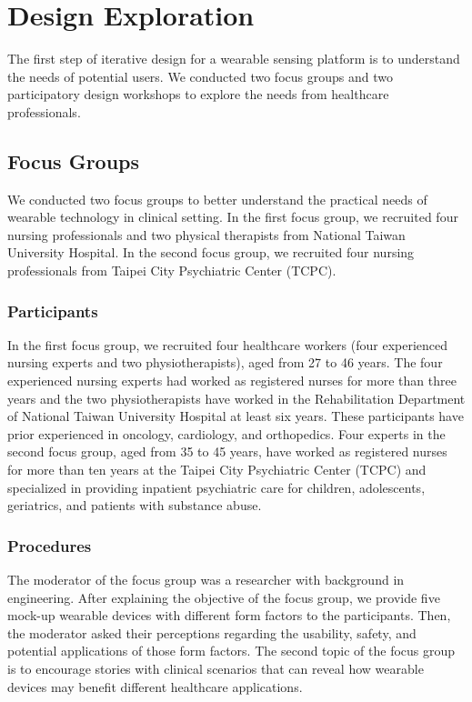 \chapter{Design Exploration}

The first step of iterative design for a wearable sensing platform is to understand the needs of potential users. We conducted two focus groups and two participatory design workshops to explore the needs from healthcare professionals.

\section{Focus Groups}
We conducted two focus groups to better understand the practical needs of wearable technology in clinical setting. In the first focus group, we recruited four nursing professionals and two physical therapists from National Taiwan University Hospital. In the second focus group, we recruited four nursing professionals from Taipei City Psychiatric Center (TCPC).

\subsection{Participants}
In the first focus group, we recruited four healthcare workers (four experienced nursing experts and two physiotherapists), aged from 27 to 46 years. The four experienced nursing experts had worked as registered nurses for more than three years and the two physiotherapists have worked in the Rehabilitation Department of National Taiwan University Hospital at least six years. These participants have prior experienced in oncology, cardiology, and orthopedics. Four experts in the second focus group, aged from 35 to 45 years, have worked as registered nurses for more than ten years at the Taipei City Psychiatric Center (TCPC) and specialized in providing inpatient psychiatric care for children, adolescents, geriatrics, and patients with substance abuse.

\subsection{Procedures}
The moderator of the focus group was a researcher with background in engineering. After explaining the objective of the focus group, we provide five mock-up wearable devices with different form factors to the participants. Then, the moderator asked their perceptions regarding the usability, safety, and potential applications of those form factors. The second topic of the focus group is to encourage stories with clinical scenarios that can reveal how wearable devices may benefit different healthcare applications.

